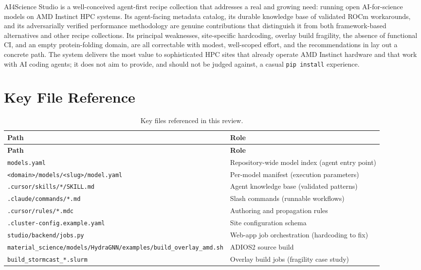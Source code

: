 \documentclass[11pt]{article}
\newcommand{\code}[1]{\texttt{#1}}
\newcommand{\file}[1]{\texttt{\small #1}}
\begin{document}
AI4Science Studio is a well-conceived agent-first recipe collection that addresses a
real and growing need: running open AI-for-science models on AMD Instinct HPC systems.
Its agent-facing metadata catalog, its durable knowledge base of validated ROCm
workarounds, and its adversarially verified performance methodology are genuine
contributions that distinguish it from both framework-based alternatives and other
recipe collections. Its principal weaknesses, site-specific hardcoding, overlay build
fragility, the absence of functional CI, and an empty protein-folding domain, are all
correctable with modest, well-scoped effort, and the recommendations in
 lay out a concrete path. The system delivers the most value
to sophisticated HPC sites that already operate AMD Instinct hardware and that work with
AI coding agents; it does not aim to provide, and should not be judged against, a
casual \code{pip install} experience.

\appendix
\section{Key File Reference}
\begin{longtable}{@{}p{6.4cm}p{7.2cm}@{}}
\caption{Key files referenced in this review.}\\
\toprule
\textbf{Path} & \textbf{Role} \\
\midrule
\endfirsthead
\toprule
\textbf{Path} & \textbf{Role} \\
\midrule
\endhead
\bottomrule
\endfoot
\file{models.yaml} & Repository-wide model index (agent entry point) \\
\file{<domain>/models/<slug>/model.yaml} & Per-model manifest (execution parameters) \\
\file{.cursor/skills/*/SKILL.md} & Agent knowledge base (validated patterns) \\
\file{.claude/commands/*.md} & Slash commands (runnable workflows) \\
\file{.cursor/rules/*.mdc} & Authoring and propagation rules \\
\file{.cluster-config.example.yaml} & Site configuration schema \\
\file{studio/backend/jobs.py} & Web-app job orchestration (hardcoding to fix) \\
\file{material\_science/models/HydraGNN/examples/build\_overlay\_amd.sh} & ADIOS2 source build \\
\file{build\_stormcast\_*.slurm} & Overlay build jobs (fragility case study) \\
\end{longtable}
\end{document}
